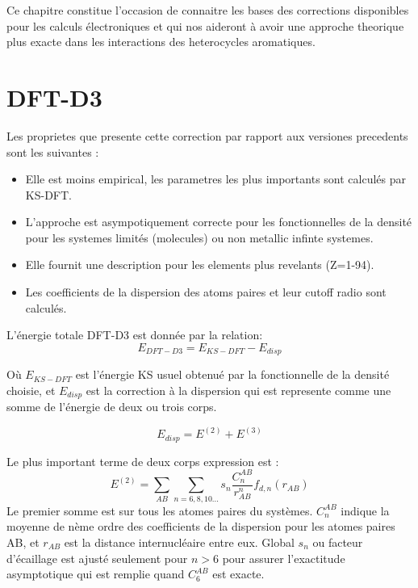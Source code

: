 	Ce chapitre constitue l'occasion de connaitre les bases des corrections disponibles pour les calculs électroniques et qui nos aideront à avoir une approche theorique plus exacte dans les interactions des heterocycles aromatiques.  
	
	\newpage
	
	\section{DFT-D3}
	
	Les proprietes que presente cette correction par rapport aux versiones precedents sont les suivantes :
	\bigskip 
	\begin{itemize}
		\item Elle est moins empirical, les parametres les plus importants sont calculés par KS-DFT.
		\item L'approche est asympotiquement correcte pour les fonctionnelles de la densité pour les systemes limités (molecules) ou non metallic infinte systemes.
		\item Elle fournit une description pour les elements plus revelants (Z=1-94).
		\item Les coefficients de la dispersion des atoms paires et leur cutoff radio sont calculés. 
	\end{itemize}
	\bigskip
	
	L'énergie totale DFT-D3 est donnée par la relation:	
	\begin{equation}
	E_{DFT-D3} = E_{KS-DFT} - E_{disp}
	\end{equation} 
	\bigskip
	
	Où $E_{KS-DFT}$ est l'énergie KS usuel obtenué par la fonctionnelle de la densité choisie, et $E_{disp}$ est la correction à la dispersion qui est represente comme une somme de l'énergie de deux ou trois corps.
	
	\begin{equation}
	E_{disp} = E ^{(2)} + E^{(3)}
	\end{equation}
	
	Le plus important terme de deux corps expression est :
	\begin{equation}
	E^{(2)} = \sum_{AB} \sum_{n=6,8,10...} s_{n}\frac{C_{n}^{AB}}{r^{n}_{AB}} f_{d,n} (r_{AB})
	\end{equation}
	Le premier somme est sur tous les atomes paires du systèmes. $C_{n}^{AB}$ indique la moyenne de nème ordre des coefficients de la dispersion pour les atomes paires AB, et $r_{AB}$ est la distance internucléaire entre eux. Global $s_{n}$ ou facteur d'écaillage est ajusté seulement pour $n>6$ pour assurer l'exactitude asymptotique qui est remplie quand $C_{6}^{AB}$ est exacte. 
	\bigskip
	
